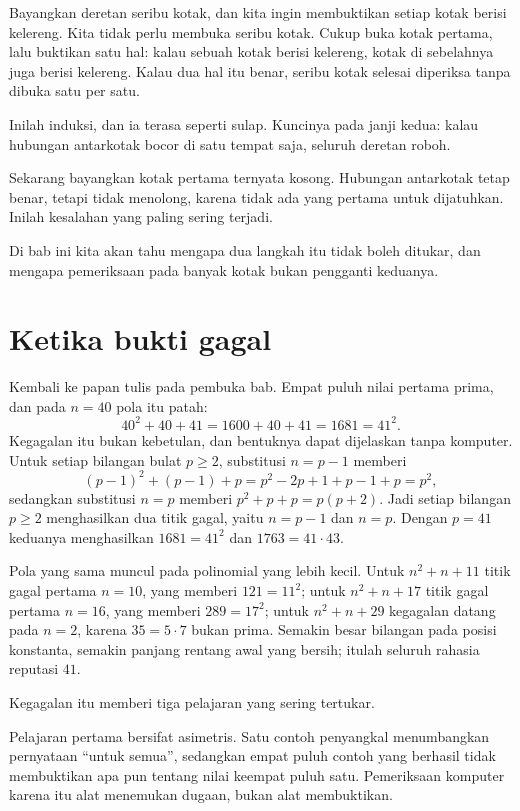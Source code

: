 \begin{untukanak}
Bayangkan deretan seribu kotak, dan kita ingin membuktikan setiap kotak berisi
kelereng. Kita tidak perlu membuka seribu kotak. Cukup buka kotak pertama, lalu buktikan
satu hal: kalau sebuah kotak berisi kelereng, kotak di sebelahnya juga berisi kelereng.
Kalau dua hal itu benar, seribu kotak selesai diperiksa tanpa dibuka satu per satu.

Inilah induksi, dan ia terasa seperti sulap. Kuncinya pada janji kedua: kalau hubungan
antarkotak bocor di satu tempat saja, seluruh deretan roboh.

Sekarang bayangkan kotak pertama ternyata kosong. Hubungan antarkotak tetap benar, tetapi
tidak menolong, karena tidak ada yang pertama untuk dijatuhkan. Inilah kesalahan yang
paling sering terjadi.

Di bab ini kita akan tahu mengapa dua langkah itu tidak boleh ditukar, dan mengapa
pemeriksaan pada banyak kotak bukan pengganti keduanya.
\end{untukanak}

\section{Ketika bukti gagal}

Kembali ke papan tulis pada pembuka bab. Empat puluh nilai pertama prima, dan pada
$n = 40$ pola itu patah:
\[
  40^{2} + 40 + 41 = 1600 + 40 + 41 = 1681 = 41^{2}.
\]
Kegagalan itu bukan kebetulan, dan bentuknya dapat dijelaskan tanpa komputer. Untuk
setiap bilangan bulat $p \geq 2$, substitusi $n = p-1$ memberi
\[
  (p-1)^{2} + (p-1) + p = p^{2} - 2p + 1 + p - 1 + p = p^{2},
\]
sedangkan substitusi $n = p$ memberi $p^{2} + p + p = p(p+2)$. Jadi setiap bilangan
$p \geq 2$ menghasilkan dua titik gagal, yaitu $n = p-1$ dan $n = p$. Dengan $p = 41$
keduanya menghasilkan $1681 = 41^{2}$ dan $1763 = 41 \cdot 43$.

Pola yang sama muncul pada polinomial yang lebih kecil. Untuk $n^{2}+n+11$ titik gagal
pertama $n = 10$, yang memberi $121 = 11^{2}$; untuk $n^{2}+n+17$ titik gagal pertama
$n = 16$, yang memberi $289 = 17^{2}$; untuk $n^{2}+n+29$ kegagalan datang pada $n = 2$,
karena $35 = 5 \cdot 7$ bukan prima. Semakin besar bilangan pada posisi konstanta,
semakin panjang rentang awal yang bersih; itulah seluruh rahasia reputasi $41$.

Kegagalan itu memberi tiga pelajaran yang sering tertukar.

Pelajaran pertama bersifat asimetris. Satu contoh penyangkal menumbangkan pernyataan
``untuk semua'', sedangkan empat puluh contoh yang berhasil tidak membuktikan apa pun
tentang nilai keempat puluh satu. Pemeriksaan komputer karena itu alat menemukan dugaan,
bukan alat membuktikan.

